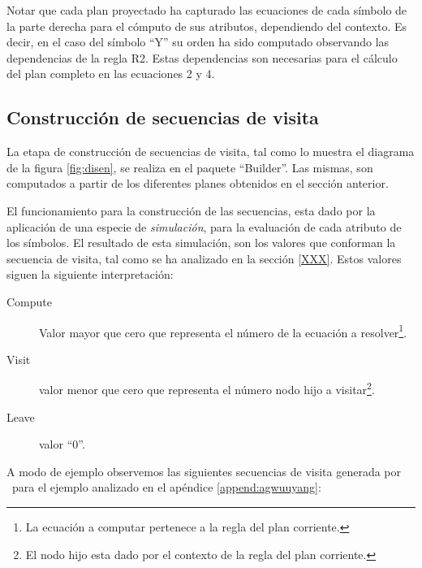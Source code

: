 Notar que cada plan proyectado ha capturado las ecuaciones de cada símbolo de la parte derecha para el cómputo de sus atributos, dependiendo del contexto. Es decir, en el caso del símbolo ``Y'' su orden ha sido computado observando las dependencias de la regla R2. Estas dependencias son necesarias para el cálculo del plan completo en las ecuaciones 2 y 4. 

\subsection*{Construcción de secuencias de visita}

La etapa de construcción de secuencias de visita, tal como lo muestra el diagrama de la figura \ref{fig:disen}, se realiza en el paquete ``Builder''. Las mismas, son computados a partir de los diferentes planes obtenidos en el sección anterior.

El funcionamiento para la construcción de las secuencias, esta dado por la aplicación de una especie de \textit{simulación}, para la evaluación de cada atributo de los símbolos. El resultado de esta simulación, son los valores que conforman la secuencia de visita, tal como se ha analizado en la sección \ref{XXX}. Estos valores siguen la siguiente interpretación: 

\begin{description}
\item [Compute] Valor mayor que cero que representa el número de la ecuación a resolver\footnote{La ecuación a computar pertenece a la regla del plan corriente.}.
\item [Visit] valor menor que cero que representa el número nodo hijo a visitar\footnote{El nodo hijo esta dado por el contexto de la regla del plan corriente.}.
\item [Leave] valor ``0''.
\end{description}

A modo de ejemplo observemos las siguientes secuencias de visita generada por \maggen\ para el ejemplo analizado en el apéndice \ref{append:agwuuyang}:

